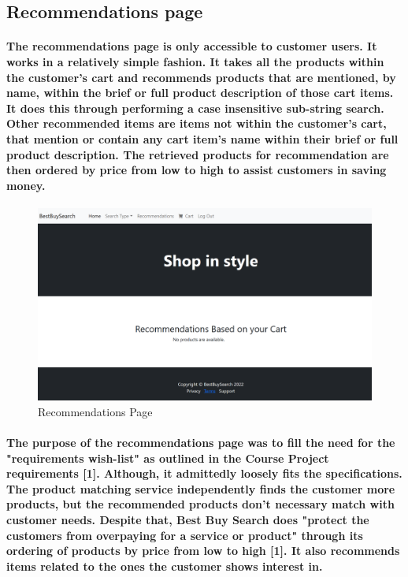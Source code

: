 \documentclass[sigconf]{acmart}
\begin{document}
\subsection{Recommendations page}
\paragraph{ The recommendations page is only accessible to customer users. It works in a relatively simple fashion. It takes all the products within the customer's cart and recommends products that are mentioned, by name, within the brief or full product description of those cart items. It does this through performing a case insensitive sub-string search. Other recommended items are items not within the customer's cart, that mention or contain any cart item's name within their brief or full product description. The retrieved products for recommendation are then ordered by price from low to high to assist customers in saving money. }  

\begin{figure}[H]
    \centering
    \includegraphics[scale=0.2]{Recommendations.PNG}
    \caption{Recommendations Page}
    \label{fig:my_label}
\end{figure}

\paragraph{ The purpose of the recommendations page was to fill the need for the "requirements wish-list" as outlined in the Course Project requirements [1]. Although, it admittedly loosely fits the specifications. The product matching service independently finds the customer more products, but the recommended products don't necessary match with customer needs. Despite that, Best Buy Search does "protect the customers from overpaying for a service or product" through its ordering of products by price from low to high [1]. It also recommends items related to the ones the customer shows interest in. }
\end{document}
